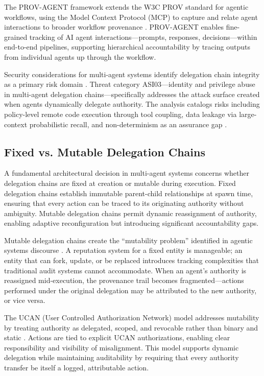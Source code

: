 The PROV-AGENT framework extends the W3C PROV standard for agentic workflows, using the Model Context Protocol (MCP) to capture and relate agent interactions to broader workflow provenance \cite{prov_agent_arxiv2508}. PROV-AGENT enables fine-grained tracking of AI agent interactions—prompts, responses, decisions—within end-to-end pipelines, supporting hierarchical accountability by tracing outputs from individual agents up through the workflow.

Security considerations for multi-agent systems identify delegation chain integrity as a primary risk domain \cite{security_multiagent_arxiv2603}. Threat category ASI03—identity and privilege abuse in multi-agent delegation chains—specifically addresses the attack surface created when agents dynamically delegate authority. The analysis catalogs risks including policy-level remote code execution through tool coupling, data leakage via large-context probabilistic recall, and non-determinism as an assurance gap \cite{security_multiagent_arxiv2603}.

\subsection{Fixed vs. Mutable Delegation Chains}

A fundamental architectural decision in multi-agent systems concerns whether delegation chains are fixed at creation or mutable during execution. Fixed delegation chains establish immutable parent-child relationships at spawn time, ensuring that every action can be traced to its originating authority without ambiguity. Mutable delegation chains permit dynamic reassignment of authority, enabling adaptive reconfiguration but introducing significant accountability gaps.

Mutable delegation chains create the ``mutability problem'' identified in agentic systems discourse \cite{reddit_mutability}. A reputation system for a fixed entity is manageable; an entity that can fork, update, or be replaced introduces tracking complexities that traditional audit systems cannot accommodate. When an agent's authority is reassigned mid-execution, the provenance trail becomes fragmented—actions performed under the original delegation may be attributed to the new authority, or vice versa.

The UCAN (User Controlled Authorization Network) model addresses mutability by treating authority as delegated, scoped, and revocable rather than binary and static \cite{ixo_agent_accountable}. Actions are tied to explicit UCAN authorizations, enabling clear responsibility and visibility of misalignment. This model supports dynamic delegation while maintaining auditability by requiring that every authority transfer be itself a logged, attributable action.

